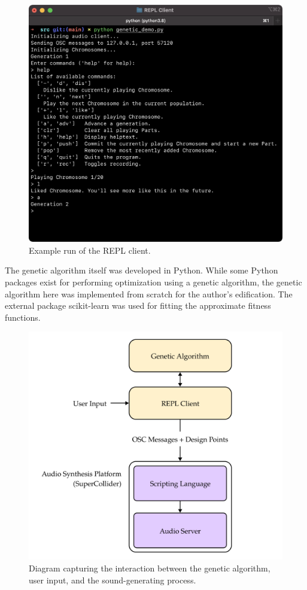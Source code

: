 \documentclass[conference]{IEEEtran}
\begin{document}
\begin{figure}[htbp]
    \centerline{\includegraphics[width=0.9\columnwidth]{figs/repl-client.png}}
    \caption{Example run of the REPL client.}
    \label{repl}
\end{figure}

The genetic algorithm itself was developed in Python. While some Python
packages exist for performing optimization using a genetic algorithm, the
genetic algorithm here was implemented from scratch for the author's
edification. The external package scikit-learn \cite{sklearn} was used
for fitting the approximate fitness functions.

\begin{figure}[htbp]
    \centerline{\includegraphics[width=0.9\columnwidth]{figs/arch.png}}
    \caption{Diagram capturing the interaction between the genetic
        algorithm, user input, and the sound-generating process.}
    \label{arch}
\end{figure}
\end{document}
